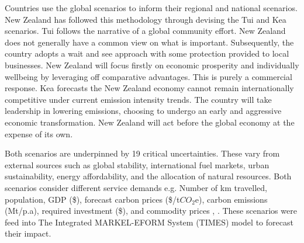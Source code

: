 \documentclass[12pt]{article}
\begin{document}
Countries use the global scenarios to inform their regional and national scenarios. 
New Zealand has followed this methodology through devising the Tui and Kea scenarios. 
Tui follows the narrative of a global community effort. 
New Zealand does not generally have a common view on what is important.
Subsequently, the country adopts a wait and see approach with some protection provided to local businesses.
New Zealand will focus firstly on economic prosperity and individually wellbeing by leveraging off comparative advantages.
This is purely a commercial response. 
Kea forecasts the New Zealand economy cannot remain internationally competitive under current emission intensity trends.
The country will take leadership in lowering emissions, choosing to undergo an early and aggressive economic transformation.
New Zealand will act before the global economy at the expense of its own.

Both scenarios are underpinned by 19 critical uncertainties. 
These vary from external sources such as global stability, international fuel markets, urban sustainability, energy affordability, and the allocation of natural resources. 
Both scenarios consider different service demands e.g. Number of km travelled, population, GDP (\$), forecast carbon prices (\$/t$CO_2$e), carbon emissions (Mt/p.a), required investment (\$), and commodity prices \cite{TR:1}, \cite{TR:2}.
These scenarios were feed into The Integrated MARKEL-EFORM System (TIMES) model to forecast their impact.
\end{document}
